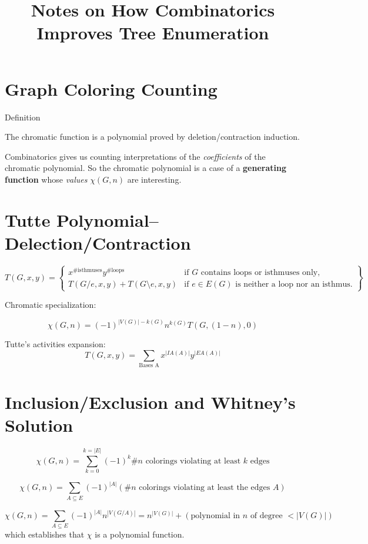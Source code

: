 \documentclass{article}
\title{Notes on How Combinatorics Improves Tree Enumeration}
\begin{document}
\maketitle

\section{Graph Coloring Counting}

\noindent Definition

\noindent The chromatic function is a polynomial proved by deletion/contraction
induction.

\noindent Combinatorics gives us counting interpretations of the \textit{coefficients}
of the chromatic polynomial.  So the chromatic polynomial is a case of 
a \textbf{generating function} whose \textit{values} $\chi(G,n)$ are interesting.  


\section{Tutte Polynomial--Delection/Contraction}

\[
T(G,x,y) = \left\{ \begin{array}{ll}
  x^{\text{\# isthmuses}}y^{\text{\# loops}} & \text{if }G\text{ contains loops or isthmuses only,}\\
  T(G/e,x,y)+T(G\setminus e,x,y) & \text{if }e\in E(G)
     \text{ is neither a loop nor an isthmus.}
  \end{array}
  \right\}
\]

Chromatic specialization:

\[
\chi(G,n) = (-1)^{|V(G)|-k(G)}n^{k(G)}T(G,(1-n),0)
\]

Tutte's activities expansion:
\[
T(G,x,y) = \sum_{\text{Bases A}}x^{|IA(A)|}y^{|EA(A)|}
\]


\section{Inclusion/Exclusion and Whitney's Solution}

\[
\chi(G,n) = \sum_{k=0}^{k=|E|}(-1)^k \text{\# }n\text{ colorings violating at least }
k\text{ edges}
\]

\[
\chi(G,n) = \sum_{A\subseteq E}(-1)^{|A|} 
(\text{\# }n\text{ colorings violating at least the edges }A)
\]

\[
\chi(G,n) = \sum_{A\subseteq E}(-1)^{|A|}
n^{|V(G/A)|} = n^{|V(G)|} + (\text{polynomial in } n \text{ of degree } < |V(G)|)
\]
which establishes that $\chi$ is a polynomial function.  
\end{document}
